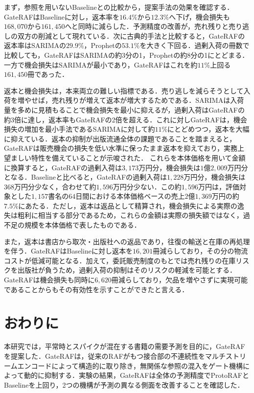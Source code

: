 \documentclass[twocolumn, lastpage]{jarticle}
\newif\ifrevmark
\newcommand{\revA}[1]{\ifrevmark{\color{blue}#1}\else#1\fi}
\begin{document}
まず，参照を用いないBaselineとの比較から，提案手法の効果を確認する．GateRAFはBaselineに対し，返本率を$16.4\%$から$12.3\%$へ下げ，機会損失も$168{,}070$から$161{,}450$へと同時に減らした．予測精度の改善が，売れ残りと売り逃しの双方の削減として現れている．次に古典的手法と比較すると，GateRAFの返本率はSARIMAの$29.9\%$，Prophetの$53.1\%$を大きく下回る．過剰入荷の冊数で比較しても，GateRAFはSARIMAの約3分の1，Prophetの約8分の1にとどまる．一方で機会損失はSARIMAが最小であり，GateRAFはこれを約$11\%$上回る$161{,}450$冊であった．

返本と機会損失は，本来両立の難しい指標である．売り逃しを減らそうとして入荷を増やせば，売れ残りが増えて返本が増大するためである．SARIMAは入荷量を多めに見積もることで機会損失を最小に抑えるが，過剰入荷はGateRAFの約3倍に達し，返本率もGateRAFの2倍を超える．これに対しGateRAFは，機会損失の増加を最小手法であるSARIMAに対して約$11\%$にとどめつつ，返本を大幅に抑えている．返本の抑制が出版流通全体の課題であることを踏まえると，GateRAFは販売機会の損失を低い水準に保ったまま返本を抑えており，実務上望ましい特性を備えていることが示唆された．
\revA{これらを本体価格を用いて金額に換算すると，GateRAFの過剰入荷は$3{,}173$万円分，機会損失は$1$億$2{,}009$万円分となる．Baselineと比べると，GateRAFの過剰入荷は$1{,}228$万円分，機会損失は$368$万円分少なく，合わせて約$1{,}596$万円分少ない．この約$1{,}596$万円は，評価対象とした$1{,}157$書名の$64$日間における本体価格ベースの売上$2$億$1{,}369$万円の約$7.5\%$にあたる．ただし，返本は返品として精算され，機会損失による実際の逸失は粗利に相当する部分であるため，これらの金額は実際の損失額ではなく，過不足の規模を本体価格で表したものである．}

\revA{また，返本は書店から取次・出版社への返品であり，往復の輸送と在庫の再処理を伴う．GateRAFはBaselineに対し返本を$16{,}201$冊減らしており，その分の物流コストが低減可能となる．加えて，委託販売制度のもとでは売れ残りの在庫リスクを出版社が負うため，過剰入荷の抑制はそのリスクの軽減を可能とする．GateRAFは機会損失も同時に$6{,}620$冊減らしており，欠品を増やさずに実現可能であることからもその有効性を示すことができたと言える．}


\section{おわりに}
本研究では，平常時とスパイクが混在する書籍の需要予測を目的に，GateRAFを提案した．GateRAFは，従来のRAFがもつ接合部の不連続性をマルチストリームエンコードによって構造的に取り除き，無関係な参照の混入をゲート機構によって動的に抑制する．実験の結果，GateRAFは全体の予測精度でProtoRAFとBaselineを上回り，2つの機構が予測の異なる側面を改善することを確認した．
\end{document}
